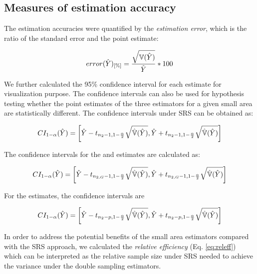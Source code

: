 \subsection{Measures of estimation accuracy}

The estimation accuracies were quantified by the \textit{estimation error}, which is the ratio of the standard error and the point estimate:

\begin{equation}\label{eq:error}
error(\hat{Y})_{[\%]}=\frac{\sqrt{\mathbb{V}(\hat{Y})}}{\hat{Y}}*100
\end{equation}

We further calculated the 95\% confidence interval for each estimate for visualization purpose. The confidence intervals can also be used for hypothesis testing whether the point estimates of the three estimators for a given small area are statistically different. The confidence intervals under SRS can be obtained as:

\begin{equation}\label{ci_1phase}
CI_{1-\alpha}(\hat{Y})=\bigg{\lbrack}\hat{Y}-t_{n_{2}-1, 1-\frac{\alpha}{2}}\sqrt{\hat{\mathbb{V}}(\hat{Y})},
\hat{Y}+t_{n_{2}-1, 1-\frac{\alpha}{2}}\sqrt{\hat{\mathbb{V}}(\hat{Y})}\bigg{\rbrack}
\end{equation}

The confidence intervals for the \psmall{} and \extpsynth{} estimates are calculated as:

\begin{equation}\label{ci_2phase_sae}
CI_{1-\alpha}(\hat{Y})=\bigg{\lbrack}\hat{Y}-t_{n_{2,G}-1, 1-\frac{\alpha}{2}}\sqrt{\hat{\mathbb{V}}(\hat{Y})},
\hat{Y}+t_{n_{2,G}-1, 1-\frac{\alpha}{2}}\sqrt{\hat{\mathbb{V}}(\hat{Y})}\bigg{\rbrack}
\end{equation}

For the \psynth{} estimates, the confidence intervals are

\begin{equation}\label{ci_2phase_global}
CI_{1-\alpha}(\hat{Y})=\bigg{\lbrack}\hat{Y}-t_{n_{2}-p, 1-\frac{\alpha}{2}}\sqrt{\hat{\mathbb{V}}(\hat{Y})},
\hat{Y}+t_{n_{2}-p, 1-\frac{\alpha}{2}}\sqrt{\hat{\mathbb{V}}(\hat{Y})}\bigg{\rbrack}
\end{equation}

In order to address the potential benefits of the small area estimators compared with the SRS approach, we calculated the \textit{relative efficiency} (Eq. \ref{eq:releff}) which can be interpreted as the relative sample size under SRS needed to achieve the variance under the double sampling estimators.

